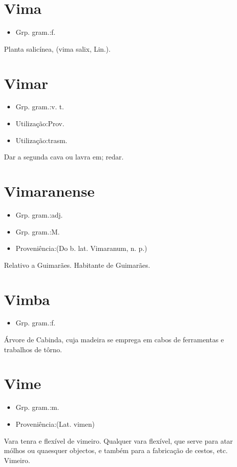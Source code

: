 \documentclass{article}
\begin{document}
\section{Vima}
\begin{itemize}
\item {Grp. gram.:f.}
\end{itemize}
Planta salicínea, (\textunderscore vima salix\textunderscore , Lin.).
\section{Vimar}
\begin{itemize}
\item {Grp. gram.:v. t.}
\end{itemize}
\begin{itemize}
\item {Utilização:Prov.}
\end{itemize}
\begin{itemize}
\item {Utilização:trasm.}
\end{itemize}
Dar a segunda cava ou lavra em; redar.
\section{Vimaranense}
\begin{itemize}
\item {Grp. gram.:adj.}
\end{itemize}
\begin{itemize}
\item {Grp. gram.:M.}
\end{itemize}
\begin{itemize}
\item {Proveniência:(Do b. lat. \textunderscore Vimaranum\textunderscore , n. p.)}
\end{itemize}
Relativo a Guimarães.
Habitante de Guimarães.
\section{Vimba}
\begin{itemize}
\item {Grp. gram.:f.}
\end{itemize}
Árvore de Cabinda, cuja madeira se emprega em cabos de ferramentas e trabalhos de tôrno.
\section{Vime}
\begin{itemize}
\item {Grp. gram.:m.}
\end{itemize}
\begin{itemize}
\item {Proveniência:(Lat. \textunderscore vimen\textunderscore )}
\end{itemize}
Vara tenra e flexível de vimeiro.
Qualquer vara flexível, que serve para atar mólhos ou quaesquer objectos, e também para a fabricação de cestos, etc.
Vimeiro.
\end{document}
